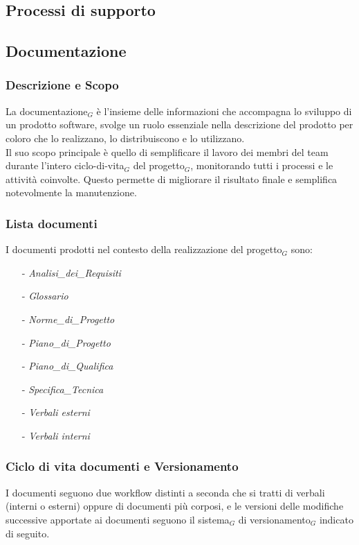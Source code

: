 \documentclass[10pt]{article}
\begin{document}
\begin{justify}
\newpage
\section{Processi di supporto}
    \subsection{Documentazione}

    \subsubsection{Descrizione e Scopo}
    La documentazione$_G$ è l'insieme delle informazioni che accompagna lo sviluppo di un prodotto software, svolge un ruolo essenziale nella descrizione del prodotto per coloro che lo realizzano, lo distribuiscono e lo utilizzano.\\
    Il suo scopo principale è quello di semplificare il lavoro dei membri del team durante l'intero ciclo-di-vita$_G$ del progetto$_G$, monitorando tutti i processi e le attività coinvolte. Questo permette di migliorare il risultato finale e semplifica notevolmente la manutenzione.

    \subsubsection{Lista documenti}
    I documenti prodotti nel contesto della realizzazione del progetto$_G$ sono:
    \begin{itemize}
        \item [-] \textit{Analisi\_dei\_Requisiti}
        \item [-] \textit{Glossario}
        \item [-] \textit{Norme\_di\_Progetto}
        \item [-] \textit{Piano\_di\_Progetto}
        \item [-] \textit{Piano\_di\_Qualifica}
        \item [-] \textit{Specifica\_Tecnica}
        \item [-] \textit{Verbali esterni}
        \item [-] \textit{Verbali interni}
    \end{itemize}

    \subsubsection{Ciclo di vita documenti e Versionamento}
    I documenti seguono due workflow distinti a seconda che si tratti di verbali (interni o esterni) oppure di documenti più corposi, e le versioni delle modifiche successive apportate ai documenti seguono il sistema$_G$ di versionamento$_G$ indicato di seguito.\\


\end{justify}
\end{document}
